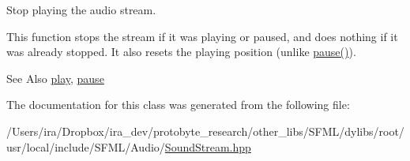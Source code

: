 Stop playing the audio stream. 

This function stops the stream if it was playing or paused, and does nothing if it was already stopped. It also resets the playing position (unlike \hyperlink{classsf_1_1_sound_stream_a932ff181e661503cad288b4bb6fe45ca}{pause()}).

\begin{DoxySeeAlso}{See Also}
\hyperlink{classsf_1_1_sound_stream_afdc08b69cab5f243d9324940a85a1144}{play}, \hyperlink{classsf_1_1_sound_stream_a932ff181e661503cad288b4bb6fe45ca}{pause} 
\end{DoxySeeAlso}


The documentation for this class was generated from the following file\-:\begin{DoxyCompactItemize}
\item 
/\-Users/ira/\-Dropbox/ira\-\_\-dev/protobyte\-\_\-research/other\-\_\-libs/\-S\-F\-M\-L/dylibs/root/usr/local/include/\-S\-F\-M\-L/\-Audio/\hyperlink{_sound_stream_8hpp}{Sound\-Stream.\-hpp}\end{DoxyCompactItemize}
